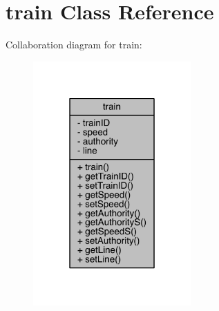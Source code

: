 \hypertarget{classtrain}{}\section{train Class Reference}
\label{classtrain}


Collaboration diagram for train\+:
\nopagebreak
\begin{figure}[H]
\begin{center}
\leavevmode
\includegraphics[width=171pt]{classtrain__coll__graph}
\end{center}
\end{figure}
